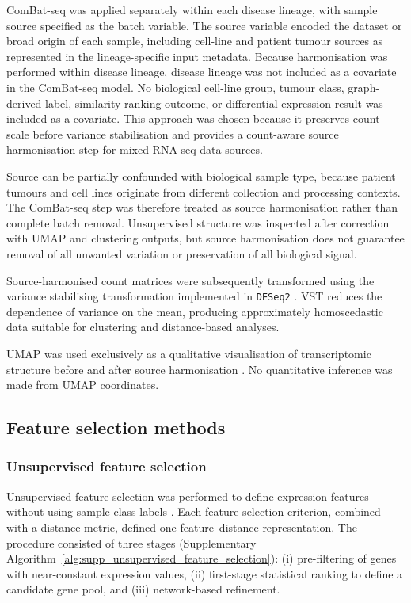 ComBat-seq was applied separately within each disease lineage, with sample
source specified as the batch variable. The source variable encoded the
dataset or broad origin of each sample, including cell-line and patient tumour
sources as represented in the lineage-specific input metadata. Because
harmonisation was performed within disease lineage, disease lineage was not
included as a covariate in the ComBat-seq model. No biological cell-line group,
tumour class, graph-derived label, similarity-ranking outcome, or
differential-expression result was included as a covariate. This approach was
chosen because it preserves count scale before variance stabilisation and
provides a count-aware source harmonisation step for mixed RNA-seq data sources.

Source can be partially confounded with biological sample type, because
patient tumours and cell lines originate from different collection and
processing contexts. The ComBat-seq step was therefore treated as source
harmonisation rather than complete batch removal. Unsupervised structure was
inspected after correction with UMAP and clustering outputs, but source
harmonisation does not guarantee removal of all unwanted variation or
preservation of all biological signal.

Source-harmonised count matrices were subsequently transformed using the
variance stabilising transformation implemented in \texttt{DESeq2}
\citep{Love2014}. VST reduces the dependence of variance on the mean, producing
approximately homoscedastic data suitable for clustering and distance-based
analyses.

UMAP was used exclusively as a qualitative visualisation of transcriptomic
structure before and after source harmonisation \citep{McInnes2020}. No quantitative
inference was made from UMAP coordinates.


\subsection{Feature selection methods}
\subsubsection{Unsupervised feature selection}

Unsupervised feature selection was performed to define expression features without using sample class labels \citep{Solorio-Fernandez2020}. Each feature-selection criterion, combined with a distance metric, defined one feature--distance representation. The procedure consisted of three stages (Supplementary
Algorithm~\ref{alg:supp_unsupervised_feature_selection}): (i) pre-filtering of genes with near-constant expression values, (ii) first-stage statistical ranking to define a candidate gene pool, and (iii) network-based refinement.

